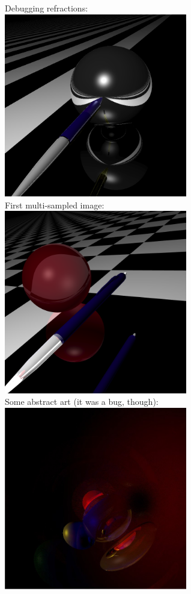 \documentclass[a4paper,11pt]{article}
\begin{document}
Debugging refractions:\\
\includegraphics[keepaspectratio,width=8.0cm]{images/master-plane-sphere-pen}\\

\newpage First multi-sampled image:\\
\includegraphics[keepaspectratio,width=8.0cm]{images/multisampling_32x_side.png}\\

Some abstract art (it was a bug, though):\\
\includegraphics[keepaspectratio,width=8.0cm]{images/abstract_art}\\
\end{document}
